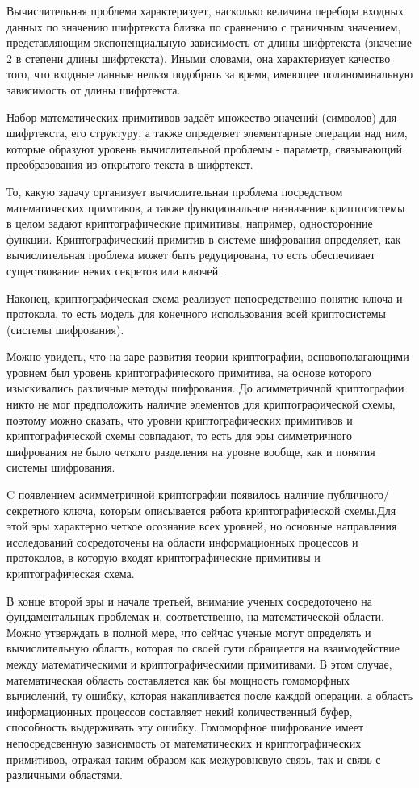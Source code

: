    

    \color{ProcessBlue}Вычислительная проблема характеризует, насколько величина перебора входных данных по значению шифртекста близка по сравнению с граничным значением, представляющим экспоненциальную зависимость от длины шифртекста (значение 2 в степени длины шифртекста). Иными словами, она характеризует качество того, что входные данные нельзя подобрать за время, имеющее полиноминальную зависимость от длины шифртекста.\par
    Набор математических примитивов задаёт множество значений (символов) для шифртекста, его структуру, а также определяет элементарные операции над ним, которые образуют уровень вычислительной проблемы - параметр, связывающий преобразования из открытого текста в шифртекст.\par
    То, какую задачу организует вычислительная проблема посредством математических примтивов, а также функциональное назначение криптосистемы в целом задают криптографические примитивы, например, односторонние функции. Криптографический примитив в системе шифрования определяет, как вычислительная проблема может быть редуцирована, то есть обеспечивает существование неких секретов или ключей.\par
    Наконец, криптографическая схема реализует непосредственно понятие ключа и протокола, то есть модель для конечного использования всей криптосистемы (системы шифрования).\par
    Можно увидеть, что на заре развития теории криптографии, основополагающими уровнем был уровень криптографического примитива, на основе которого изыскивались различные методы шифрования. До асимметричной криптографии никто не мог предположить наличие элементов для криптографической схемы, поэтому можно сказать, что уровни криптографических примитивов и криптографической схемы совпадают, то есть для эры симметричного шифрования не было четкого разделения на уровне вообще, как и понятия системы шифрования.\par
    C появлением асимметричной криптографии появилось наличие публичного/секретного ключа, которым описывается работа криптографической схемы.\color{RoyalBlue}Для этой эры характерно четкое осознание всех уровней, но основные направления исследований сосредоточены на области информационных процессов и протоколов, в которую входят криптографические примитивы и криптографическая схема.\par
    В конце второй эры и начале третьей, внимание ученых сосредоточено на фундаментальных проблемах и, соответственно, на математической области. Можно утверждать в полной мере, что сейчас ученые могут определять и вычислительную область, которая по своей сути обращается на взаимодействие между математическими и криптографическими примитивами. В этом случае, математическая область составляется как бы мощность гомоморфных вычислений, ту ошибку, которая накапливается после каждой операции, а область информационных процессов составляет некий количественный буфер, способность выдерживать эту ошибку. Гомоморфное шифрование имеет непосредсвенную зависимость от математических и криптографических примитивов, отражая таким образом как межуровневую связь, так и связь с различными областями.\par
\normalcolor
